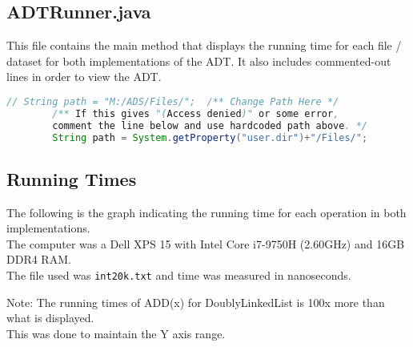 \documentclass{article}
\newcommand{\code}[1]{\texttt{#1}}
\begin{document}
\bigskip

\subsection{ADTRunner.java}
This file contains the main method that displays the running time for each file / dataset for both implementations of the ADT. It also includes commented-out lines in order to view the ADT.
\begin{lstlisting}[language=Java]
        // String path = "M:/ADS/Files/";  /** Change Path Here */
        /** If this gives "(Access denied)" or some error,
        comment the line below and use hardcoded path above. */
        String path = System.getProperty("user.dir")+"/Files/";
\end{lstlisting}


\newpage
{}

\subsection{Running Times}
The following is the graph indicating the running time for each operation in both implementations.\\ The computer was a Dell XPS 15 with Intel Core i7-9750H (2.60GHz) and 16GB DDR4 RAM.\\
The file used was \code{int20k.txt} and time was measured in nanoseconds.

\bigskip

\pgfplotsset{width=15cm,compat=1.9}
\begin{center}

\small{Note: The running times of ADD(x) for DoublyLinkedList is 100x more than what is displayed.\\ This was done to maintain the Y axis range.}

\end{center}
\end{document}
